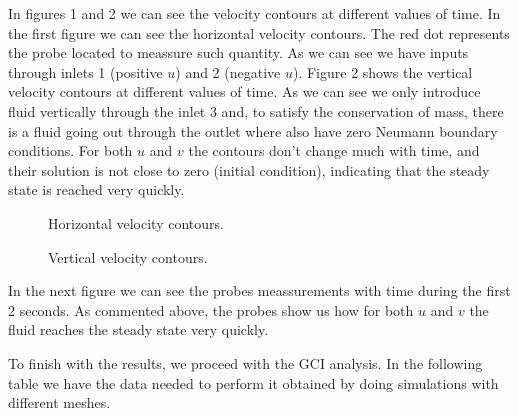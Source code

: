 In figures 1 and 2 we can see the velocity contours at different values of time. In the first figure we can see the horizontal velocity contours. The red dot represents the probe located to meassure such quantity. As we can see we have inputs through inlets 1 (positive $u$) and 2 (negative $u$). Figure 2 shows the vertical velocity contours at different values of time. As we can see we only introduce fluid vertically through the inlet 3 and, to satisfy the conservation of mass, there is a fluid going out through the outlet where also have zero Neumann boundary conditions. For both $u$ and $v$ the contours don't change much with time, and their solution is not close to zero (initial condition), indicating that the steady state is reached very quickly.

\begin{figure}[H]
\centering     %
\hspace*{\fill}
\hfill
{}
\hspace*{\fill}

\hspace*{\fill}
\hfill
{}
\hspace*{\fill}
\caption{Horizontal velocity contours.}
\end{figure}

\begin{figure}[H]
\centering     %
\hspace*{\fill}
\hfill
{}
\hspace*{\fill}

\hspace*{\fill}
\hfill
{}
\hspace*{\fill}
\caption{Vertical velocity contours.}
\end{figure}

In the next figure we can see the probes meassurements with time during the first 2 seconds. As commented above, the probes show us how for both $u$ and $v$ the fluid reaches the steady state very quickly.

To finish with the results, we proceed with the GCI analysis. In the following table we have the data needed to perform it obtained by doing simulations with different meshes.

